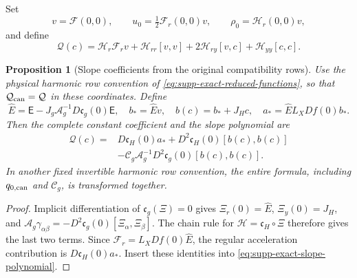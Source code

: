 \documentclass[11pt]{article}
\numberwithin{equation}{section}
\newtheorem{proposition}[proposition]{Proposition}
\theoremstyle{definition}
\theoremstyle{remark}
\begin{document}
Set
\begin{equation}
 v=\mathcal F(0,0),\qquad
 u_0=\tfrac12\mathcal F_r(0,0)v,
 \qquad
 \rho_0=\mathcal H_r(0,0)v,
 \label{eq:supp-exact-slope-data}
\end{equation}
and define
\begin{equation}
 \mathcal Q(c)=
 \mathcal H_r\mathcal F_rv+\mathcal H_{rr}[v,v]
 +2\mathcal H_{ry}[v,c]+\mathcal H_{yy}[c,c].
 \label{eq:supp-exact-slope-polynomial}
\end{equation}

\begin{proposition}[Slope coefficients from the original compatibility rows]
\label{prop:supp-exact-original-slope-jets}
Use the physical harmonic row convention of
\eqref{eq:supp-exact-reduced-functions}, so that
$\mathcal Q_{\rm can}=\mathcal Q$ in these coordinates.  Define
\begin{equation}
 \widehat E=\mathsf E-J_g\mathcal A_g^{-1}D\mathfrak c_g(0)\mathsf E,
 \quad b_*=\widehat Ev,\quad b(c)=b_*+J_Hc,
 \quad a_*=\widehat E L_XDf(0)b_*.
 \label{eq:supp-exact-original-slope-directions}
\end{equation}
Then the complete constant coefficient and the slope polynomial are
\begin{equation}
 \begin{split}
 \mathcal Q(c)={}&D\mathfrak c_H(0)a_*
   +D^2\mathfrak c_H(0)[b(c),b(c)]\\
   &-\mathcal C_g\mathcal A_g^{-1}
                   D^2\mathfrak c_g(0)[b(c),b(c)].
 \end{split}
 \label{eq:supp-exact-original-slope-jets}
\end{equation}
In another fixed invertible harmonic row convention, the entire formula,
including $q_{0,\rm can}$ and $\mathcal C_g$, is transformed together.
\end{proposition}
\begin{proof}
Implicit differentiation of $\mathfrak c_g(\Xi)=0$ gives
$\Xi_r(0)=\widehat E$, $\Xi_y(0)=J_H$, and
$\mathcal A_g\gamma_{\alpha\beta}
 =-D^2\mathfrak c_g(0)[\Xi_\alpha,\Xi_\beta]$.
The chain rule for $\mathcal H=\mathfrak c_H\circ\Xi$ therefore gives the
last two terms.  Since $\mathcal F_r=L_XDf(0)\widehat E$, the regular
acceleration contribution is $D\mathfrak c_H(0)a_*$.  Insert these
identities into \eqref{eq:supp-exact-slope-polynomial}.
\end{proof}
\end{document}
